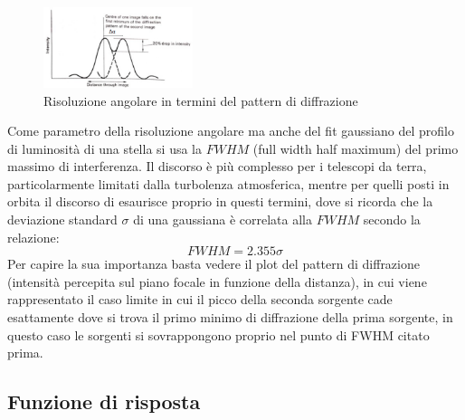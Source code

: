 \begin{figure}
	\vspace{-10pt}
	\centering
	\includegraphics[width=0.39\textwidth]{Immagini/Capitolo2/Risoluzione_angolare.PNG}
	\caption*{Risoluzione angolare in termini del pattern di diffrazione}
	\vspace{-5pt}
\end{figure}

Come parametro della risoluzione angolare ma anche del fit gaussiano del profilo di luminosità di una stella si usa la $FWHM$ (full width half maximum) del primo massimo di interferenza. Il discorso è più complesso per i telescopi da terra, particolarmente limitati dalla turbolenza atmosferica, mentre per quelli posti in orbita il discorso di esaurisce proprio in questi termini, dove si ricorda che la deviazione standard $\sigma$ di una gaussiana è correlata alla $FWHM$ secondo la relazione:
\begin{equation}
	\label{eq:FWHM}
	FWHM=2.355\sigma
\end{equation}
Per capire la sua importanza basta vedere il plot del pattern di diffrazione (intensità percepita sul piano focale in funzione della distanza), in cui viene rappresentato il caso limite in cui il picco della seconda sorgente cade esattamente dove si trova il primo minimo di diffrazione della prima sorgente, in questo caso le sorgenti si sovrappongono proprio nel punto di FWHM citato prima.

\subsection*{Funzione di risposta}

